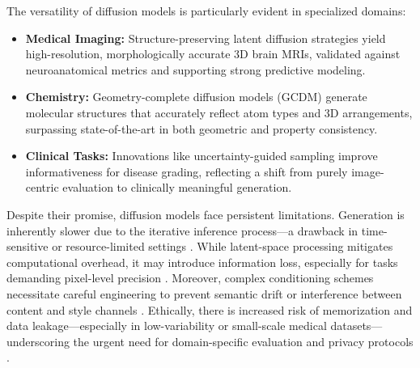 The versatility of diffusion models is particularly evident in specialized domains:
\begin{itemize}
    \item \textbf{Medical Imaging:} Structure-preserving latent diffusion strategies yield high-resolution, morphologically accurate 3D brain MRIs, validated against neuroanatomical metrics and supporting strong predictive modeling.
    \item \textbf{Chemistry:} Geometry-complete diffusion models (GCDM) generate molecular structures that accurately reflect atom types and 3D arrangements, surpassing state-of-the-art in both geometric and property consistency.
    \item \textbf{Clinical Tasks:} Innovations like uncertainty-guided sampling improve informativeness for disease grading, reflecting a shift from purely image-centric evaluation to clinically meaningful generation.
\end{itemize}

Despite their promise, diffusion models face persistent limitations. Generation is inherently slower due to the iterative inference process—a drawback in time-sensitive or resource-limited settings \cite{ref73,ref76,ref90}. While latent-space processing mitigates computational overhead, it may introduce information loss, especially for tasks demanding pixel-level precision \cite{ref73,ref76}. Moreover, complex conditioning schemes necessitate careful engineering to prevent semantic drift or interference between content and style channels \cite{ref102}. Ethically, there is increased risk of memorization and data leakage—especially in low-variability or small-scale medical datasets—underscoring the urgent need for domain-specific evaluation and privacy protocols \cite{ref91,ref100}.

